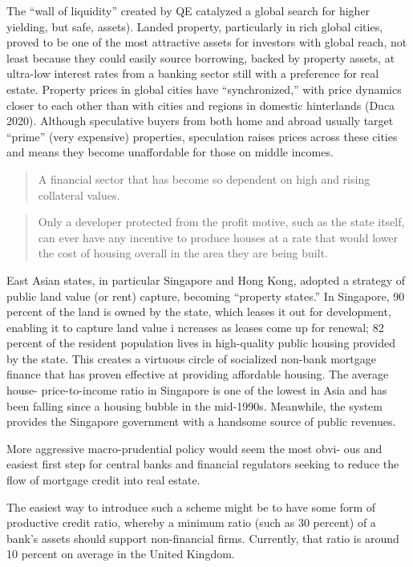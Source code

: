 \documentclass[
]{book}
\begin{document}
The ``wall of liquidity'' created by QE catalyzed a global search for
higher yielding, but safe, assets). Landed property, particularly
in rich global cities, proved to be one of the most attractive
assets for investors with global reach, not least because they could
easily source borrowing, backed by property assets, at ultra-­low
interest rates from a banking sector still with a preference for real
estate. Property prices in global cities have ``synchronized,'' with price
dynamics closer to each other than with cities and regions in domestic
hinterlands (Duca 2020). Although speculative buyers from both
home and abroad usually target ``prime'' (very expensive) properties,
speculation raises prices across these cities and means they become
unaffordable for those on middle incomes.

\begin{quote}
A financial sector that has become so dependent on high and rising collateral values.
\end{quote}

\begin{quote}
Only a developer
protected from the profit motive, such as the state itself, can ever have
any incentive to produce houses at a rate that would lower the cost
of housing overall in the area they are being built.
\end{quote}

East Asian states, in particular Singapore and Hong Kong,
adopted a strategy of public land value
(or rent) capture, becoming ``property states.'' In
Singapore, 90 percent of the land is owned by the state, which leases
it out for development, enabling it to capture land value i ­ ncreases as
leases come up for renewal; 82 percent of the resident population lives
in high-­quality public housing provided by the state.
This creates a virtuous circle
of socialized non-­bank mortgage finance that has proven effective at
providing affordable housing.
The average house-­
price-­to-­income ratio in Singapore is one of the lowest in Asia and has
been falling since a housing bubble in the mid-­1990s. Meanwhile, the
system provides the Singapore government with a handsome source
of public revenues.

More aggressive macro-­prudential policy would seem the most obvi-
ous and easiest first step for central banks and financial regulators
seeking to reduce the flow of mortgage credit into real estate.

The easiest way
to introduce such a scheme might be to have some form of productive
credit ratio, whereby a minimum ratio (such as 30 percent) of a
bank's assets should support non-­financial firms. Currently, that ratio
is around 10 percent on average in the United Kingdom.
\end{document}
